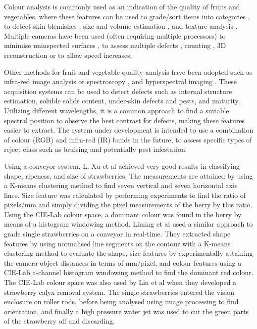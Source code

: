 \documentclass[fleqn,twoside,12pt]{report}
\begin{document}
Colour analysis is commonly used as an indication of the quality of fruits and vegetables, where these features can be used to grade/sort items into categories \cite{jun, elmasry3}, to detect skin blemishes \cite{blasco3, leemans}, size and volume estimation \cite{bundit, elmasry3}, and texture analysis \cite{jun, rakun}. Multiple cameras have been used (often requiring multiple processors) to minimise uninspected surfaces \cite{zouxiao, qingzhong}, to assess multiple defects \cite{blasco4}, counting \cite{song}, 3D reconstruction \cite{panitnat} or to allow speed increases\cite{reece}.   

Other methods for fruit and vegetable quality analysis have been adopted such as infra-red image analysis or spectroscopy \cite{guthrie, bureau, yande}, and hyperspectral imaging \cite{renfu} \cite{jianwei, mendoza, rajkumar}. These acquisition systems can be used to detect defects such as internal structure estimation, soluble solids content, under-skin defects and pests, and maturity. Utilizing different wavelengths, it is a common approach to find a suitable spectral position to observe the best contrast for defects, making these features easier to extract\cite{ariana, piotr}. The system under development is intended to use a combination of colour (RGB) and infra-red (IR) bands in the future, to assess specific types of reject class such as bruising and potentially pest infestation. 

Using a conveyor system, L. Xu et al \cite{xu} achieved very good results in classifying shape, ripeness, and size of strawberries. The measurements are attained by using a K-means clustering method to find seven vertical and seven horizontal axis lines. Size feature was calculated by performing experiments to find the ratio of pixels/mm and simply dividing the pixel measurements of the berry by this ratio. Using the CIE-Lab colour space, a dominant colour was found in the berry by means of a histogram windowing method. Liming et al \cite{liming} used a similar approach to grade single strawberries on a conveyor in real-time. They extracted shape features by using normalised line segments on the contour with a K-means clustering method to evaluate the shape, size features by experimentally attaining the camera-object distances in terms of mm/pixel, and colour features using a CIE-Lab a-channel histogram windowing method to find the dominant red colour. The CIE-Lab colour space was also used by Lin et al \cite{lin} when they developed a strawberry calyx removal system. The single strawberries entered the vision enclosure on roller rods, before being analysed using image processing to find orientation, and finally a high pressure water jet was used to cut the green parts of the strawberry off and discarding.
\end{document}

